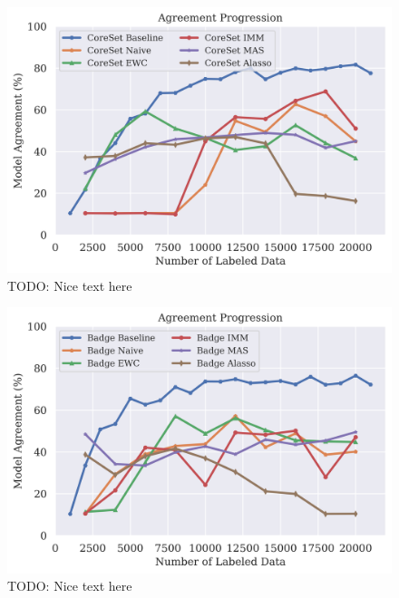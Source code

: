 \begin{figure}[h]
    \centering
    \includegraphics[width=0.8\linewidth]{images/results_CALMS/mnist_label_coreset.png}
    \caption[Agreement Comparison for Model Stealing on MNIST using the top1-label and the Active Learning strategy CoreSet]{TODO: Nice text here}
    \label{fig:CALMSMNISTLabelCoreSet}
\end{figure}

\begin{figure}[h]
    \centering
    \includegraphics[width=0.8\linewidth]{images/results_CALMS/mnist_label_badge.png}
    \caption[Agreement Comparison for Model Stealing on MNIST using the top1-label and the Active Learning strategy Badge]{TODO: Nice text here}
    \label{fig:CALMSMNISTLabelBadge}
\end{figure}

